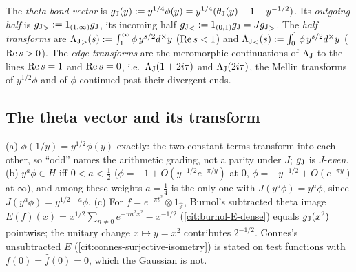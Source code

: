 \begin{definition}
\label{def:theta-bond-vector}
The \emph{theta bond vector} is $g_{\mathrm J}(y) := y^{1/4}\phi(y) = y^{1/4}(\theta_{\mathrm J}(y) - 1 - y^{-1/2})$. Its \emph{outgoing
half} is ${g_{\mathrm J}}_{>} := 1_{(1,\infty)}g_{\mathrm J}$, its incoming half ${g_{\mathrm J}}_{<} := 1_{(0,1)}g_{\mathrm J} = J{g_{\mathrm J}}_{>}$. The \emph{half
transforms} are ${\Lambda_{\mathrm J}}_{>}(s) := \int_1^\infty\phi\,y^{s/2}d^\times y$ ($\operatorname{Re} s<1$) and ${\Lambda_{\mathrm J}}_{<}(s) :=
\int_0^1\phi\,y^{s/2}d^\times y$ ($\operatorname{Re} s>0$). The \emph{edge transforms} are the meromorphic continuations of
$\Lambda_{\mathrm J}$ to the lines $\operatorname{Re} s = 1$ and $\operatorname{Re} s = 0$, i.e.\ $\Lambda_{\mathrm J}(1+2i\tau)$ and $\Lambda_{\mathrm J}(2i\tau)$, the Mellin
transforms of $y^{1/2}\phi$ and of $\phi$ continued past their divergent ends.
\end{definition}

\subsection{The theta vector and its transform}

\begin{proposition}
\label{prop:theta-vector-weight}
(a) $\phi(1/y) = y^{1/2}\phi(y)$ exactly: the two constant terms transform into each other, so ``odd'' names the
arithmetic grading, not a parity under $J$; $g_{\mathrm J}$ is $J$-\emph{even}. (b) $y^a\phi\in H$ iff $0<a<\tfrac12$
($\phi = -1 + O(y^{-1/2}e^{-\pi/y})$ at $0$, $\phi = -y^{-1/2} + O(e^{-\pi y})$ at $\infty$), and among these weights
$a = \tfrac14$ is the only one with $J(y^a\phi) = y^a\phi$, since $J(y^a\phi) = y^{1/2-a}\phi$. (c) For
$f = e^{-\pi t^2}\otimes1_{\hat{\mathbb Z}}$, Burnol's subtracted theta image $E(f)(x) = x^{1/2}\sum_{n\ne0}e^{-\pi n^2x^2}
- x^{-1/2}$ (\cref{cit:burnol-E-dense}) equals $g_{\mathrm J}(x^2)$ pointwise; the unitary change $x\mapsto y = x^2$
contributes $2^{-1/2}$. Connes's unsubtracted $E$ (\cref{cit:connes-surjective-isometry}) is stated on test functions
with $f(0) = \widehat f(0) = 0$, which the Gaussian is not.
\end{proposition}

